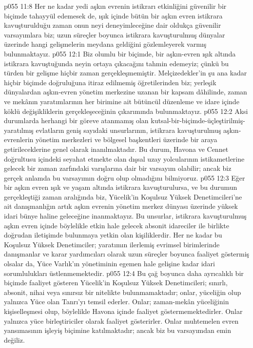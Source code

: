 \vs p055 11:8 Her ne kadar yedi aşkın evrenin istikrarı etkinliğini güvenilir bir biçimde tahayyül edemesek de, ışık içinde bütün bir aşkın evren istikrara kavuşturulduğu zaman onun neyi deneyimleceğine dair oldukça güvenilir varsayımlara biz; uzun süreçler boyunca istikrara kavuşturulmuş dünyalar üzerinde hangi gelişmelerin meydana geldiğini gözlemleyerek varmış bulunmaktayız.
\vs p055 12:1 Biz olumlu bir biçimde, bir aşkın\hyp{}evren ışık altında istikrara kavuştuğunda neyin ortaya çıkacağını tahmin edemeyiz; çünkü bu türden bir gelişme hiçbir zaman gerçekleşmemiştir. Melçizedekler’in şu ana kadar hiçbir biçimde doğruluğuna itiraz edilmemiş öğretilerinden biz; yerleşik dünyalardan aşkın\hyp{}evren yönetim merkezine uzanan bir kapsam dâhilinde, zaman ve mekânın yaratımlarının her birimine ait bütüncül düzenleme ve idare içinde köklü değişikliklerin gerçekleşeceğinin çıkarımında bulunmaktayız.
\vs p055 12:2 Aksi durumlarda herhangi bir göreve atanmamış olan kutsal\hyp{}bir\hyp{}biçimde\hyp{}üçleştirilmiş\hyp{}yaratılmış evlatların geniş sayıdaki unsurlarının, istikrara kavuşturulmuş aşkın\hyp{}evrenlerin yönetim merkezleri ve bölgesel başkentleri üzerinde bir araya getirileceklerine genel olarak inanılmaktadır. Bu durum, Havona ve Cennet doğrultusu içindeki seyahat etmekte olan dışsal uzay yolcularının istikametlerine gelecek bir zaman zarfındaki varışlarına dair bir varsayım olabilir; ancak biz gerçek anlamda bu varsayımın doğru olup olmadığını bilmiyoruz.
\vs p055 12:3 Eğer bir aşkın evren ışık ve yaşam altında istikrara kavuşturulursa, ve bu durumun gerçekleştiği zaman aralığında biz, Yücelik’in Koşulsuz Yüksek Denetimcileri’ne ait danışmanlığın artık aşkın evrenin yönetim merkez dünyası üzerinde yüksek idari bünye haline geleceğine inanmaktayız. Bu unsurlar, istikrara kavuşturulmuş aşkın evren içinde böylelikle etkin hale gelecek absonit idareciler ile birlikte doğrudan iletişimde bulunmaya yetkin olan kişiliklerdir. Her ne kadar bu Koşulsuz Yüksek Denetimciler; yaratımın ilerlemiş evrimsel birimlerinde danışmanlar ve karar yardımcıları olarak uzun süreçler boyunca faaliyet göstermiş olsalar da, Yüce Varlık’ın yönetiminin egemen hale gelişine kadar idari sorumlulukları üstlenmemektedir.
\vs p055 12:4 Bu çağ boyunca daha ayrıcalıklı bir biçimde faaliyet gösteren Yücelik’in Koşulsuz Yüksek Denetimcileri; sınırlı, absonit, nihai veya sınırsız bir nitelikte bulunmamaktadır; onlar, yüceliğin  olup yalnızca Yüce olan Tanrı’yı temsil ederler. Onlar; zaman\hyp{}mekân yüceliğinin kişiselleşmesi olup, böylelikle Havona içinde faaliyet göstermemektedirler. Onlar yalnızca yüce birleştiriciler olarak faaliyet gösterirler. Onlar muhtemelen evren yansımasının işleyiş biçimine katılmaktadır; ancak biz bu varsayımdan emin değiliz.
